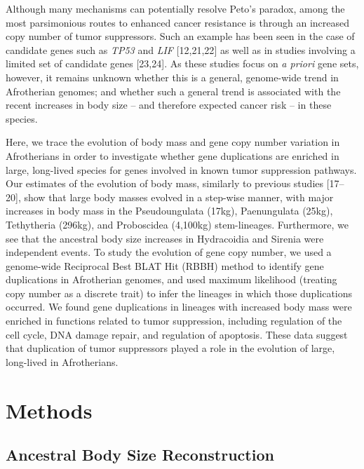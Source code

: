 \documentclass[]{elsarticle} %
\begin{document}
Although many mechanisms can potentially resolve Peto's paradox, among
the most parsimonious routes to enhanced cancer resistance is through an
increased copy number of tumor suppressors. Such an example has been
seen in the case of candidate genes such as \emph{TP53} and \emph{LIF}
{[}12,21,22{]} as well as in studies involving a limited set of
candidate genes {[}23,24{]}. As these studies focus on \emph{a priori}
gene sets, however, it remains unknown whether this is a general,
genome-wide trend in Afrotherian genomes; and whether such a general
trend is associated with the recent increases in body size -- and
therefore expected cancer risk -- in these species.

Here, we trace the evolution of body mass and gene copy number variation
in Afrotherians in order to investigate whether gene duplications are
enriched in large, long-lived species for genes involved in known tumor
suppression pathways. Our estimates of the evolution of body mass,
similarly to previous studies {[}17--20{]}, show that large body masses
evolved in a step-wise manner, with major increases in body mass in the
Pseudoungulata (17kg), Paenungulata (25kg), Tethytheria (296kg), and
Proboscidea (4,100kg) stem-lineages. Furthermore, we see that the
ancestral body size increases in Hydracoidia and Sirenia were
independent events. To study the evolution of gene copy number, we used
a genome-wide Reciprocal Best BLAT Hit (RBBH) method to identify gene
duplications in Afrotherian genomes, and used maximum likelihood
(treating copy number as a discrete trait) to infer the lineages in
which those duplications occurred. We found gene duplications in
lineages with increased body mass were enriched in functions related to
tumor suppression, including regulation of the cell cycle, DNA damage
repair, and regulation of apoptosis. These data suggest that duplication
of tumor suppressors played a role in the evolution of large, long-lived
in Afrotherians.

\hypertarget{methods}{%
\section{Methods}\label{methods}}

\hypertarget{ancestral-body-size-reconstruction}{%
\subsection{Ancestral Body Size
Reconstruction}\label{ancestral-body-size-reconstruction}}
\end{document}
